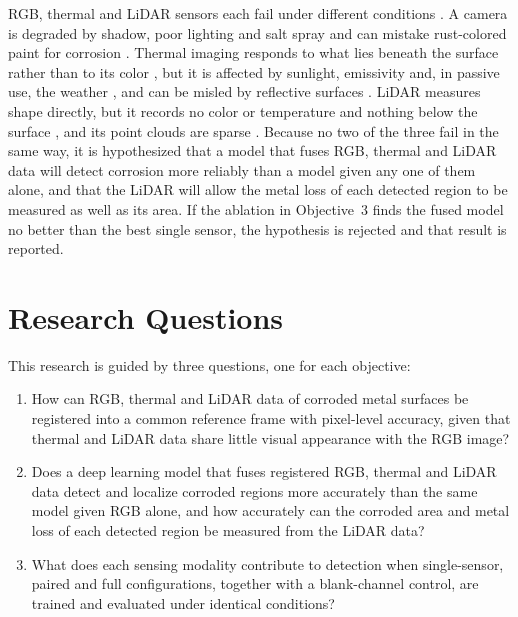 RGB, thermal and LiDAR sensors each fail under different conditions
\citep{Tran2024}. A camera is degraded by shadow, poor lighting and salt spray
\citep{Soares2023,Mao2026,Espinoza2026} and can mistake rust-colored paint
for corrosion \citep{Espinoza2026,Lavadiya2022}. Thermal imaging responds to
what lies beneath the surface rather than to its color
\citep{Elizalde2023,Doshvarpassand2022,Hernndez-Surez2026}, but it is affected
by sunlight, emissivity and, in passive use, the weather
\citep{Elizalde2023,Egodawela2025}, and can be misled by reflective surfaces
\citep{Tran2024}. LiDAR measures shape directly, but it records no color or
temperature and nothing below the surface \citep{Ding2025}, and its point
clouds are sparse \citep{Tran2024}. Because no two of the three fail in the
same way, it is hypothesized that a model that fuses RGB, thermal and LiDAR
data will detect corrosion more reliably than a model given any one of them
alone, and that the LiDAR will allow the metal loss of each detected region to
be measured as well as its area. If the ablation in Objective~3 finds the
fused model no better than the best single sensor, the hypothesis is rejected
and that result is reported.

\section{Research Questions}
\label{sec:research-questions}

This research is guided by three questions, one for each objective:

\begin{enumerate}[label=RQ\arabic*.,leftmargin=*,itemsep=8pt]
  \item How can RGB, thermal and LiDAR data of corroded metal surfaces be
        registered into a common reference frame with pixel-level accuracy,
        given that thermal and LiDAR data share little visual appearance with
        the RGB image?
  \item Does a deep learning model that fuses registered RGB, thermal and
        LiDAR data detect and localize corroded regions more accurately than
        the same model given RGB alone, and how accurately can the corroded
        area and metal loss of each detected region be measured from the LiDAR
        data?
  \item What does each sensing modality contribute to detection when
        single-sensor, paired and full configurations, together with a
        blank-channel control, are trained and evaluated under identical
        conditions?
\end{enumerate}

